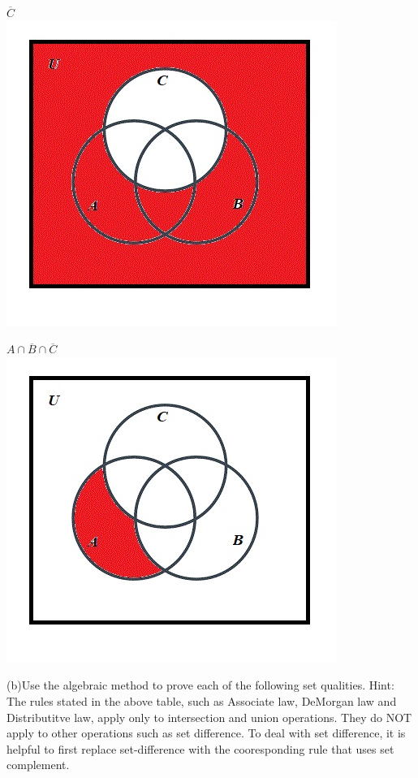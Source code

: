 \documentclass[10pt]{article}
\begin{document}
$\overline{C}$\\
\includegraphics[scale=0.55]{19}

$A \cap \overline{B} \cap \overline{C}$\\
\includegraphics[scale=0.55]{20}

(b)Use the algebraic method to prove each of the following set qualities.
Hint: The rules stated in the above table, such as Associate law, DeMorgan law and Distributitve law, apply only to intersection and union operations.  They do NOT apply to other operations such as set difference.  To deal with set difference, it is helpful to first replace set-difference with the cooresponding rule that uses set complement.\\
\end{document}
